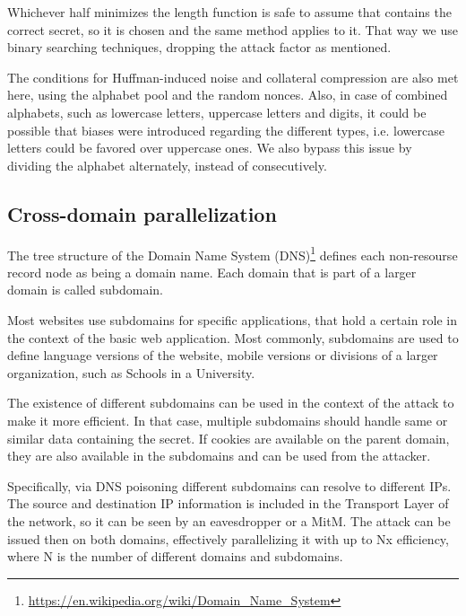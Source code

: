 Whichever half minimizes the length function is safe to assume that contains the
correct secret, so it is chosen and the same method applies to it. That way we
use binary searching techniques, dropping the attack factor as mentioned.

The conditions for Huffman-induced noise and collateral compression are also met
here, using the alphabet pool and the random nonces. Also, in case of combined
alphabets, such as lowercase letters, uppercase letters and digits, it could be
possible that biases were introduced regarding the different types, i.e.
lowercase letters could be favored over uppercase ones. We also bypass this
issue by dividing the alphabet alternately, instead of consecutively.

\subsection{Cross-domain parallelization}

The tree structure of the Domain Name System
(DNS)\footnote{\url{https://en.wikipedia.org/wiki/Domain_Name_System}} defines
each non-resourse record node as being a domain name. Each domain that is part
of a larger domain is called subdomain.

Most websites use subdomains for specific applications, that hold a certain role
in the context of the basic web application. Most commonly, subdomains are used
to define language versions of the website, mobile versions or divisions of a
larger organization, such as Schools in a University.

The existence of different subdomains can be used in the context of the attack
to make it more efficient. In that case, multiple subdomains should handle same
or similar data containing the secret. If cookies are available on the parent
domain, they are also available in the subdomains and can be used from the
attacker.

Specifically, via DNS poisoning different subdomains can resolve to different
IPs. The source and destination IP information is included in the Transport
Layer of the network, so it can be seen by an eavesdropper or a MitM. The attack
can be issued then on both domains, effectively parallelizing it with up to Nx
efficiency, where N is the number of different domains and subdomains.
